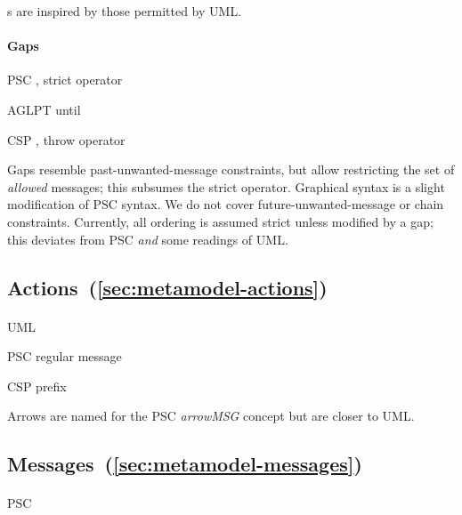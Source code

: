 \mloopbound s are inspired by those permitted by UML.

\paragraph{Gaps}
\begin{featset}
\item[PSC] , strict operator
\item[AGLPT] until
\item[CSP] , throw operator
\end{featset}

Gaps resemble past-unwanted-message constraints, but
allow restricting the set of \emph{allowed} messages;
this subsumes the strict operator.  Graphical syntax is a slight
modification of PSC syntax.  We do not cover
future-unwanted-message or chain constraints.  Currently, all
ordering is assumed strict unless modified by a gap; this
deviates from PSC \emph{and} some readings of UML.
    
\subsection{Actions~(\ref{sec:metamodel-actions})}

\paragraph{\marrowaction}
\begin{featset}
\item[UML] 
\item[PSC] regular message
\item[CSP] prefix
\end{featset}

Arrows are named for the PSC \emph{arrowMSG} concept but are closer
to UML.
      
\subsection{Messages~(\ref{sec:metamodel-messages})}

\paragraph{\mmessageset}
\begin{featset}
\item[PSC] 
\end{featset}

